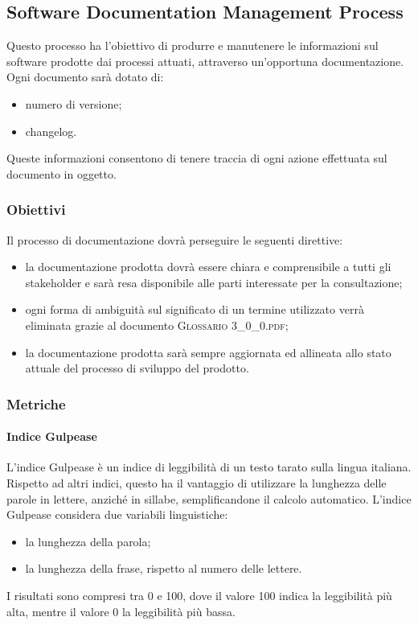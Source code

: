 	\subsection{Software Documentation Management Process}
	Questo processo ha l'obiettivo di produrre e manutenere le informazioni sul software prodotte dai processi
	attuati, attraverso un'opportuna documentazione.
	Ogni documento sarà dotato di:
		\begin{itemize}
			\item numero di versione;
			\item changelog.
		\end{itemize}
	Queste informazioni consentono di tenere traccia di ogni azione effettuata sul documento in oggetto.
		
		\subsubsection{Obiettivi}
		Il processo di documentazione dovrà perseguire le seguenti direttive:
			\begin{itemize}
				\item la documentazione prodotta dovrà essere chiara e comprensibile a tutti gli stakeholder e sarà resa disponibile alle parti interessate per la consultazione;
				\item ogni forma di ambiguità sul significato di un termine utilizzato verrà eliminata grazie al documento \textsc{Glossario 3\_0\_0.pdf};
				\item la documentazione prodotta sarà sempre aggiornata ed allineata allo stato attuale del
				processo di sviluppo del prodotto.
			\end{itemize}
		
		\subsubsection{Metriche}
			
			\paragraph{Indice Gulpease}
			L'indice Gulpease è un indice di leggibilità di un testo tarato sulla lingua italiana.
			Rispetto ad altri indici, questo ha il vantaggio di utilizzare la lunghezza delle parole in lettere, anziché in sillabe, semplificandone il calcolo automatico. L'indice Gulpease considera due variabili linguistiche:
			\begin{itemize}
				\item la lunghezza della parola;
				\item la lunghezza della frase, rispetto al numero delle lettere.
			\end{itemize}
			I risultati sono compresi tra 0 e 100, dove il valore 100 indica la leggibilità più alta, mentre il valore 0 la leggibilità più bassa.
			
